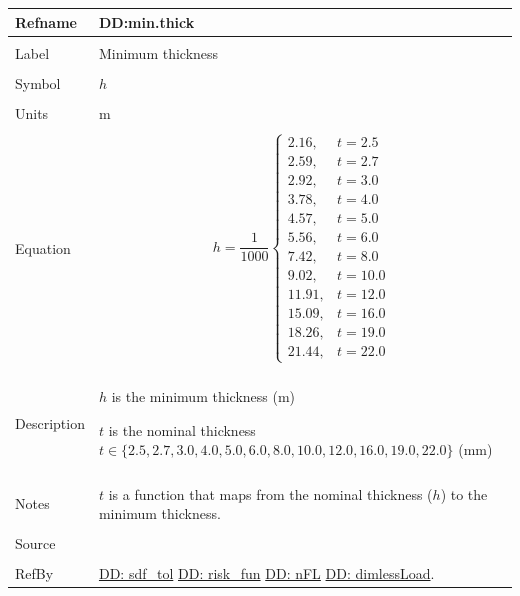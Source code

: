 \documentclass[12pt]{article}
\begin{document}
\noindent \begin{minipage}{\textwidth}
\begin{tabular}{p{} p{}}
\toprule \textbf{Refname} & \textbf{DD:min.thick}
\label{DD:min.thick}
\\ \midrule \\
Label & Minimum thickness
\\ \midrule \\
Symbol & $h$
\\ \midrule \\
Units & m
\\ \midrule \\
Equation & \begin{displaymath}
           h=\frac{1}{1000} \begin{cases}
2.16, & t=2.5\\
2.59, & t=2.7\\
2.92, & t=3.0\\
3.78, & t=4.0\\
4.57, & t=5.0\\
5.56, & t=6.0\\
7.42, & t=8.0\\
9.02, & t=10.0\\
11.91, & t=12.0\\
15.09, & t=16.0\\
18.26, & t=19.0\\
21.44, & t=22.0
\end{cases}
           \end{displaymath}
\\ \midrule \\
Description & \begin{symbDescription}
              \item{$h$ is the minimum thickness (m)}
              \item{$t$ is the nominal thickness $t\in{}\{2.5,2.7,3.0,4.0,5.0,6.0,8.0,10.0,12.0,16.0,19.0,22.0\}$ (mm)}
              \end{symbDescription}
\\ \midrule \\
Notes & $t$ is a function that maps from the nominal thickness ($h$) to the minimum thickness.
\\ \midrule \\
Source & \cite{astm2009}
\\ \midrule \\
RefBy & \hyperref[DD:sdf.tol]{DD: sdf\_tol} \hyperref[DD:risk.fun]{DD: risk\_fun} \hyperref[DD:nFL]{DD: nFL} \hyperref[DD:dimlessLoad]{DD: dimlessLoad}.
\\ \bottomrule \end{tabular}
\end{minipage}
\par~
\end{document}
